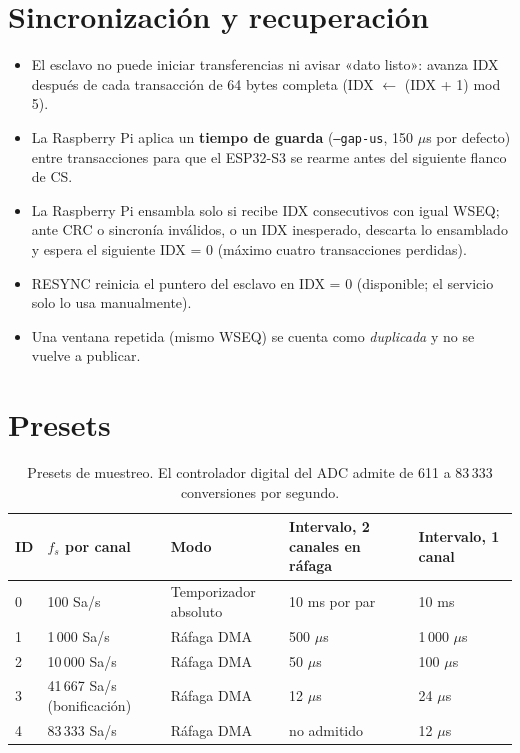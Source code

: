 \documentclass[12pt,a4paper]{article}
\begin{document}
\section{Sincronización y recuperación}

\begin{itemize}
  \item El esclavo no puede iniciar transferencias ni avisar «dato listo»: avanza IDX después de cada transacción de 64 bytes completa (IDX $\leftarrow$ (IDX + 1) mod 5).
  \item La Raspberry Pi aplica un \textbf{tiempo de guarda} (\texttt{--gap-us}, 150 $\mu$s por defecto) entre transacciones para que el ESP32-S3 se rearme antes del siguiente flanco de CS.
  \item La Raspberry Pi ensambla solo si recibe IDX consecutivos con igual WSEQ; ante CRC o sincronía inválidos, o un IDX inesperado, descarta lo ensamblado y espera el siguiente IDX = 0 (máximo cuatro transacciones perdidas).
  \item RESYNC reinicia el puntero del esclavo en IDX = 0 (disponible; el servicio solo lo usa manualmente).
  \item Una ventana repetida (mismo WSEQ) se cuenta como \emph{duplicada} y no se vuelve a publicar.
\end{itemize}

\section{Presets}

\begin{table}[H]
\centering
\small
\begin{tabular}{@{}p{0.9cm} p{3.0cm} p{3.6cm} p{3.4cm} p{3.4cm}@{}}
\toprule
\textbf{ID} & \textbf{$f_s$ por canal} & \textbf{Modo} & \textbf{Intervalo, 2 canales en ráfaga} & \textbf{Intervalo, 1 canal} \\
\midrule
0 & 100 Sa/s    & Temporizador absoluto & 10 ms por par & 10 ms \\
1 & 1\,000 Sa/s & Ráfaga DMA & 500 $\mu$s & 1\,000 $\mu$s \\
2 & 10\,000 Sa/s & Ráfaga DMA & 50 $\mu$s & 100 $\mu$s \\
3 & 41\,667 Sa/s (bonificación) & Ráfaga DMA & 12 $\mu$s & 24 $\mu$s \\
4 & 83\,333 Sa/s & Ráfaga DMA & no admitido & 12 $\mu$s \\
\bottomrule
\end{tabular}
\caption{Presets de muestreo. El controlador digital del ADC admite de 611 a 83\,333 conversiones por segundo.}
\end{table}
\end{document}
